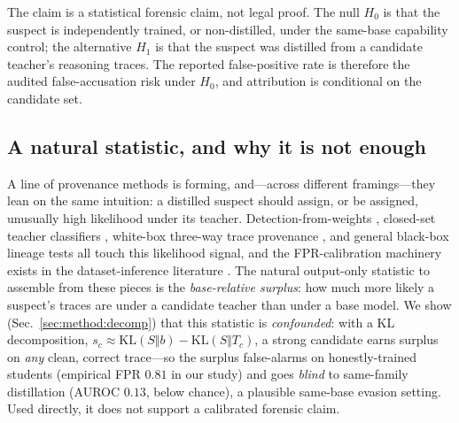 The claim is a statistical forensic claim, not legal proof. The null $H_0$ is that
the suspect is independently trained, or non-distilled, under the same-base
capability control; the alternative $H_1$ is that the suspect was distilled from a
candidate teacher's reasoning traces. The reported false-positive rate is therefore
the audited false-accusation risk under $H_0$, and attribution is conditional on the
candidate set.

\subsection{A natural statistic, and why it is not enough}
A line of provenance methods is forming, and---across different
framings---they lean on the same intuition: a distilled suspect should assign, or be
assigned, unusually high likelihood under its teacher. Detection-from-weights
\cite{shi2025distillationdetection}, closed-set teacher classifiers
\cite{wadhwa2025whotaught}, white-box three-way trace provenance
\cite{liu2025wheredid}, and general black-box lineage tests
\cite{nikolic2025modelprovenance, qiu2026provenanceset} all touch this
likelihood signal, and the FPR-calibration machinery exists in the dataset-inference
literature \cite{maini2021datasetinference, maini2024llmdatasetinference, oren2024testsetcontamination, zhao2025posthocdatasetinference, dziedzic2022selfsupervised}.
The natural output-only statistic to assemble from these pieces is the
\emph{base-relative surplus}: how much more likely a suspect's traces are under a
candidate teacher than under a base model. We show (Sec.~\ref{sec:method:decomp})
that this statistic is \emph{confounded}: with a KL decomposition,
$s_c\!\approx\!\mathrm{KL}(S\Vert b)-\mathrm{KL}(S\Vert T_c)$, a strong candidate
earns surplus on \emph{any} clean, correct trace---so the surplus false-alarms on
honestly-trained students (empirical FPR $0.81$ in our study) and goes \emph{blind}
to same-family distillation (AUROC $0.13$, below chance), a plausible same-base
evasion setting. Used directly, it does not support a calibrated forensic
claim.

